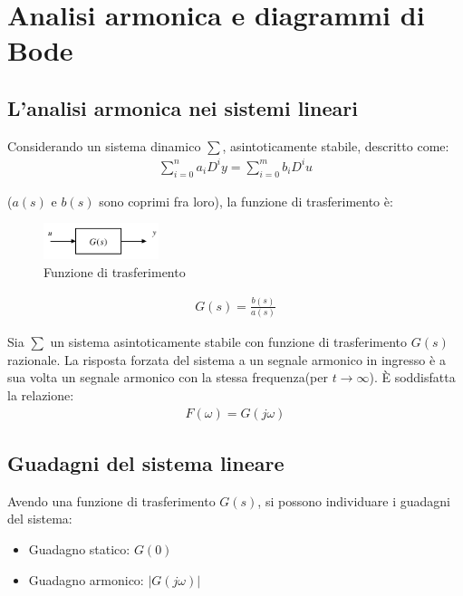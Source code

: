 \section{Analisi armonica e diagrammi di Bode}

\subsection{L'analisi armonica nei sistemi lineari}

Considerando un sistema dinamico $\sum$, asintoticamente stabile, descritto come:
\begin{align}
    \sum_{i=0}^{n} a_i D^i y = \sum_{i=0}^{m} b_i D^i u
\end{align}

($a(s)$ e $b(s)$ sono coprimi fra loro), la funzione di trasferimento è:

\begin{figure}[h!]
    \centering
    \includegraphics[width=0.3\textwidth]{images/fdt.png}
    \caption{Funzione di trasferimento}
    \label{fig:fdt}
\end{figure}

\begin{align}
    G(s) = \frac{b(s)}{a(s)}
\end{align}



\begin{theorem}
    Sia $\sum$ un sistema asintoticamente stabile con funzione di trasferimento $G(s)$
    razionale.
    La risposta forzata del sistema a un segnale armonico in ingresso è 
    a sua volta un segnale armonico con la stessa frequenza(per $t \to \infty$).
    \`E soddisfatta la relazione:
    \begin{align}
        F(\omega) = G(j\omega)
    \end{align}
\end{theorem}



\subsection{Guadagni del sistema lineare}
Avendo una funzione di trasferimento $G(s)$, si possono individuare i guadagni del sistema:
\begin{itemize}
    \item Guadagno statico: $G(0)$
    \item Guadagno armonico: $|G(j\omega)|$
\end{itemize}


